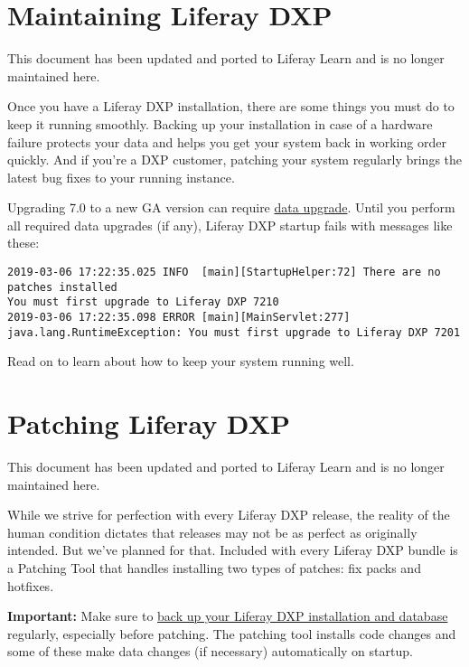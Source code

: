 \chapter{Maintaining Liferay DXP}\label{maintaining-liferay-dxp}

{This document has been updated and ported to Liferay Learn and is no
longer maintained here.}

Once you have a Liferay DXP installation, there are some things you must
do to keep it running smoothly. Backing up your installation in case of
a hardware failure protects your data and helps you get your system back
in working order quickly. And if you're a DXP customer, patching your
system regularly brings the latest bug fixes to your running instance.

\noindent\hrulefill

Upgrading 7.0 to a new GA version can require
\href{/docs/7-2/deploy/-/knowledge_base/d/upgrading-to-product-ver}{data
upgrade}. Until you perform all required data upgrades (if any), Liferay
DXP startup fails with messages like these:

\begin{verbatim}
2019-03-06 17:22:35.025 INFO  [main][StartupHelper:72] There are no patches installed
You must first upgrade to Liferay DXP 7210
2019-03-06 17:22:35.098 ERROR [main][MainServlet:277] java.lang.RuntimeException: You must first upgrade to Liferay DXP 7201
\end{verbatim}

\noindent\hrulefill

Read on to learn about how to keep your system running well.

\chapter{Patching Liferay DXP}\label{patching-liferay-dxp}

{This document has been updated and ported to Liferay Learn and is no
longer maintained here.}

While we strive for perfection with every Liferay DXP release, the
reality of the human condition dictates that releases may not be as
perfect as originally intended. But we've planned for that. Included
with every Liferay DXP bundle is a Patching Tool that handles installing
two types of patches: fix packs and hotfixes.

\noindent\hrulefill

\textbf{Important:} Make sure to
\href{/docs/7-2/deploy/-/knowledge_base/d/backing-up-a-liferay-installation}{back
up your Liferay DXP installation and database} regularly, especially
before patching. The patching tool installs code changes and some of
these make data changes (if necessary) automatically on startup.

